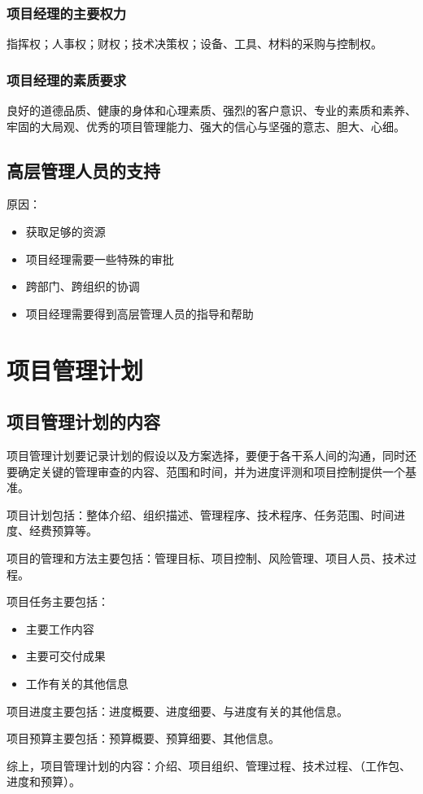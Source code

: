 \subsubsection*{项目经理的主要权力}
指挥权；人事权；财权；技术决策权；设备、工具、材料的采购与控制权。
\subsubsection*{项目经理的素质要求}
良好的道德品质、健康的身体和心理素质、强烈的客户意识、专业的素质和素养、牢固的大局观、优秀的项目管理能力、强大的信心与坚强的意志、胆大、心细。
\subsection{高层管理人员的支持}
原因：
\begin{itemize}
	\item 获取足够的资源
	\item 项目经理需要一些特殊的审批
	\item 跨部门、跨组织的协调
	\item 项目经理需要得到高层管理人员的指导和帮助
\end{itemize}
\section{项目管理计划}
\subsection{项目管理计划的内容}
项目管理计划要记录计划的假设以及方案选择，要便于各干系人间的沟通，同时还要确定关键的管理审查的内容、范围和时间，并为进度评测和项目控制提供一个基准。
\par 项目计划包括：整体介绍、组织描述、管理程序、技术程序、任务范围、时间进度、经费预算等。
\par 项目的管理和方法主要包括：管理目标、项目控制、风险管理、项目人员、技术过程。
\par 项目任务主要包括：
\begin{itemize}
	\item 主要工作内容
	\item 主要可交付成果
	\item 工作有关的其他信息
\end{itemize}
\par 项目进度主要包括：进度概要、进度细要、与进度有关的其他信息。
\par 项目预算主要包括：预算概要、预算细要、其他信息。
\par 综上，项目管理计划的内容：介绍、项目组织、管理过程、技术过程、（工作包、进度和预算）。
